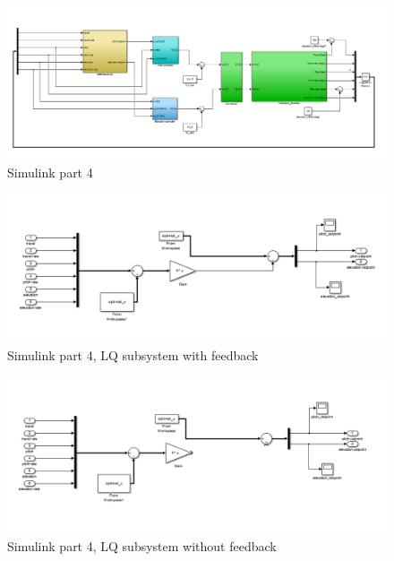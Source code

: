 \documentclass[a4paper, 12pt]{article}\usepackage[utf8]{inputenc}
\begin{document}
\begin{figure}[H]
    \centering
    \includegraphics[width=150mm]{Part4/simulink_part4.PNG}
    \caption{Simulink part 4}
    \label{fig:sim4}
\end{figure}

\begin{figure}[H]
    \centering
    \includegraphics[width=150mm]{Part4/LQ_with_feedback_part4.PNG}
    \caption{Simulink part 4, LQ subsystem with feedback}
    \label{fig:sim4_sub1}
\end{figure}

\begin{figure}[H]
    \centering
    \includegraphics[width=150mm]{Part4/LQ_without_feedback_part4.PNG}
    \caption{Simulink part 4, LQ subsystem without feedback}
    \label{fig:sim4_sub2}
\end{figure}



\end{document}
